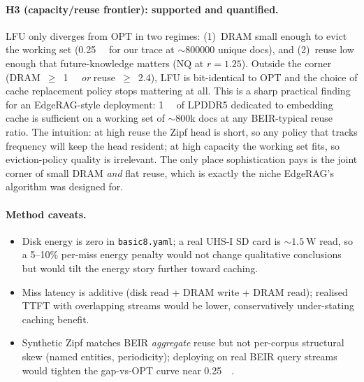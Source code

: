 \documentclass[11pt]{article}
\begin{document}
\paragraph{H3 (capacity/reuse frontier): supported and quantified.}
LFU only diverges from OPT in two regimes: (1)~DRAM small enough to evict the working set
(\SI{0.25}{\giga\byte} for our trace at $\sim$\num{800000} unique docs), and (2)~reuse low enough
that future-knowledge matters (NQ at $r{=}1.25$). Outside the corner
(DRAM~$\geq$~\SI{1}{\giga\byte} \emph{or} reuse~$\geq$~\num{2.4}), LFU is bit-identical to OPT
and the choice of cache replacement policy stops mattering at all. This is a sharp practical
finding for an EdgeRAG-style deployment: \SI{1}{\giga\byte} of LPDDR5 dedicated to embedding
cache is sufficient on a working set of $\sim$\num{800}k docs at any BEIR-typical reuse ratio.
The intuition: at high reuse the Zipf head is short, so any policy that tracks frequency
will keep the head resident; at high capacity the working set fits, so eviction-policy
quality is irrelevant. The only place sophistication pays is the joint corner of small DRAM
\emph{and} flat reuse, which is exactly the niche EdgeRAG's algorithm was designed for.

\paragraph{Method caveats.}
\begin{itemize}
  \item Disk energy is zero in \texttt{basic8.yaml}; a real UHS-I SD card is $\sim\!\SI{1.5}{\watt}$ read, so a 5--10\% per-miss energy penalty would not change qualitative conclusions but would tilt the energy story further toward caching.
  \item Miss latency is additive (disk read + DRAM write + DRAM read); realised TTFT with overlapping streams would be lower, conservatively under-stating caching benefit.
  \item Synthetic Zipf matches BEIR \emph{aggregate} reuse but not per-corpus structural skew (named entities, periodicity); deploying on real BEIR query streams would tighten the gap-vs-OPT curve near \SI{0.25}{\giga\byte}.
\end{itemize}

\end{document}
